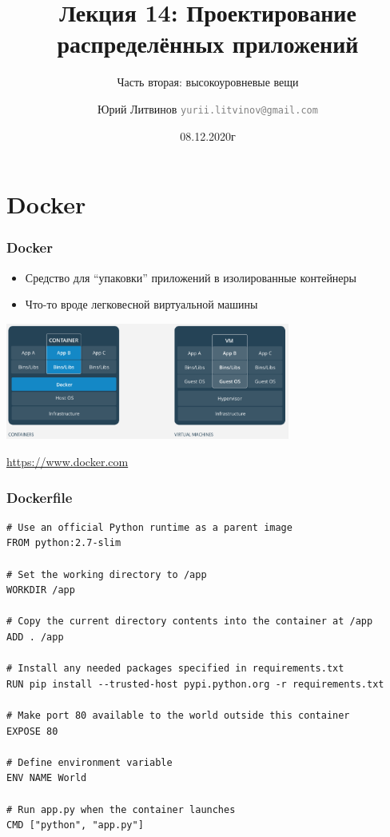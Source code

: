 \documentclass[xetex,mathserif,serif]{beamer}
\title{Лекция 14: Проектирование распределённых приложений}
\subtitle{Часть вторая: высокоуровневые вещи}
\author[Юрий Литвинов]{Юрий Литвинов \newline \textcolor{gray}{\small\texttt{yurii.litvinov@gmail.com}}}
\date{08.12.2020г}
\newcommand{\attribution}[1] {
	\begin{flushright}\begin{scriptsize}\textcolor{gray}{\textcopyright\; #1}\end{scriptsize}\end{flushright}
}
\begin{document}
	
	\frame{\titlepage}

	\section{Docker}

	\begin{frame}
		\frametitle{Docker}
		\begin{itemize}
			\item Средство для ``упаковки'' приложений в изолированные контейнеры
			\item Что-то вроде легковесной виртуальной машины
		\end{itemize}
		\begin{center}
			\includegraphics[width=0.7\textwidth]{docker.png}
			\attribution{\url{https://www.docker.com}}
		\end{center}
	\end{frame}
	
	\begin{frame}[fragile]
		\frametitle{Dockerfile}
		\begin{scriptsize}
			\begin{verbatim}
# Use an official Python runtime as a parent image
FROM python:2.7-slim

# Set the working directory to /app
WORKDIR /app

# Copy the current directory contents into the container at /app
ADD . /app

# Install any needed packages specified in requirements.txt
RUN pip install --trusted-host pypi.python.org -r requirements.txt

# Make port 80 available to the world outside this container
EXPOSE 80

# Define environment variable
ENV NAME World

# Run app.py when the container launches
CMD ["python", "app.py"]
			\end{verbatim}
		\end{scriptsize}
	\end{frame}
\end{document}
